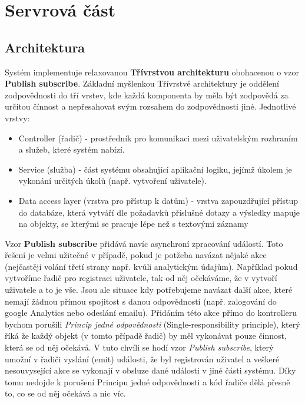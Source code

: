 
\section{Servrová část}

\subsection{Architektura}
Systém implementuje relaxovanou \textbf{Třívrstvou architekturu} obohacenou o vzor \textbf{Publish subscribe}. Základní myšlenkou Třívrstvé architektury je oddělení zodpovědnosti do tří vrstev, kde každá komponenta by měla být zodpovědá za určitou čínnost a nepřesahovat svým rozsahem do zodpovědnosti jiné. Jednotlivé vrstvy:
\begin{itemize}
    \item Controller (řadič) - prostředník pro komunikaci mezi uživatelským rozhraním a služeb, které systém nabízí.
    \item Service (služba) - část systému obsahující aplikační logiku, jejímž úkolem je vykonání určitých úkolů (např. vytvoření uživatele).
    \item Data access layer (vrstva pro přístup k datům) - vrstva zapouzdřující přístup do databáze, která vytváří dle požadavků příslušné dotazy a výsledky mapuje na objekty, se kterými se pracuje lépe než s textovými záznamy
\end{itemize}

Vzor \textbf{Publish subscribe} přidává navíc asynchroní zpracování událostí. Toto řešení je velmi užitečné v případě, pokud je potžeba navázat nějaké akce (nejčastěji volání třetí strany např. kvůli analytickým údajům). Například pokud vytvoříme řadič pro registraci uživatele, tak od něj očekáváme, že v vytvoří uživatele a to je vše. Jsou ale situace kdy potřebujeme navázat další akce, které nemají žádnou přímou spojitost s danou odpovědností (např. zalogování do google Analytics nebo odeslání emailu). Přidáním této akce přímo do kontrolleru bychom porušili \textit{Princip jedné odpovědnosti} (Single-responsibility principle), který říká že každý objekt (v tomto případě řadič) by měl vykonávat pouze činnost, která se od něj očekává. V tuto chvíli se hodí vzor \textit{Publish subscribe}, který umožní v řadiči vyslání (emit) události, že byl registrován uživatel a veškeré nesouvysející akce se vykonají v obsluze dané události v jiné části systému. Díky tomu nedojde k porušení Principu jedné odpovědnosti a kód řadiče dělá přesně to, co se od něj očekává a nic víc.

